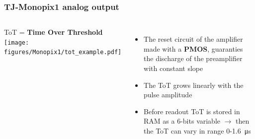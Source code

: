     \begin{frame}
        \frametitle{TJ-Monopix1 analog output}
        \begin{columns}
            ToT = \textbf{Time Over Threshold}\\
            \bigskip
            \hspace*{-0.5cm} 
                \texttt{[image: figures/Monopix1/tot\_example.pdf]}
                \begin{itemize}
                    \item The reset circuit of the amplifier made with a \textbf{PMOS}, guaranties the discharge of the preamplifier with constant slope
                    \item The ToT grows linearly with the pulse amplitude
                    \item Before readout ToT is stored in RAM as a 6-bits variable $\rightarrow$ then the ToT can vary in range 0-\SI{1.6}{\us}
                \end{itemize}
        \end{columns}
    \end{frame} 



 







